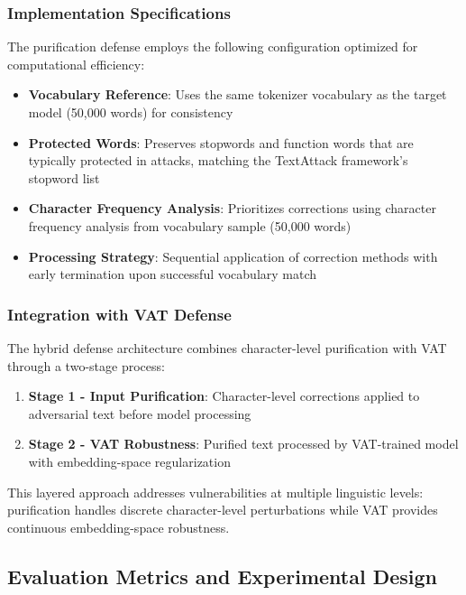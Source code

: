 \documentclass[../main.tex]{subfiles}
\begin{document}
\subsubsection{Implementation Specifications}

The purification defense employs the following configuration optimized for computational efficiency:

\begin{itemize}
\item \textbf{Vocabulary Reference}: Uses the same tokenizer vocabulary as the target model (50,000 words) for consistency
\item \textbf{Protected Words}: Preserves stopwords and function words that are typically protected in attacks, matching the TextAttack framework's stopword list

\item \textbf{Character Frequency Analysis}: Prioritizes corrections using character frequency analysis from vocabulary sample (50,000 words)
\item \textbf{Processing Strategy}: Sequential application of correction methods with early termination upon successful vocabulary match
\end{itemize}

\subsubsection{Integration with VAT Defense}

The hybrid defense architecture combines character-level purification with VAT through a two-stage process:

\begin{enumerate}
\item \textbf{Stage 1 - Input Purification}: Character-level corrections applied to adversarial text before model processing
\item \textbf{Stage 2 - VAT Robustness}: Purified text processed by VAT-trained model with embedding-space regularization
\end{enumerate}

This layered approach addresses vulnerabilities at multiple linguistic levels: purification handles discrete character-level perturbations while VAT provides continuous embedding-space robustness.


\subsection{Evaluation Metrics and Experimental Design}
\end{document}
